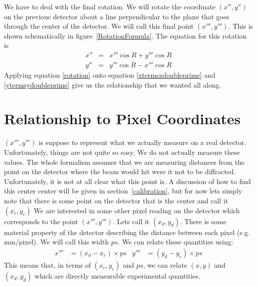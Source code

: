\begin{SCfigure}[1][htb]
    \centering
    
    \caption{Here, we take a point on a plane rotated
    by angle $\beta$ about $\hat y$ and by angle
    $\alpha$ about $\hat x'$. We then rotated this point
    about a line normal to the plane going through the
    origin by angle $R$. Rotating the point is 
    equivalent to rotating the plane.}
    \label{RotationFormula}
\end{SCfigure}

We have to deal with the final rotation. We will
rotate the coordinate $(x'',y'')$ on the
previous detector about a line perpendicular to
the plane that goes through the center of the
detector. We will call this final
point $(x''',y''')$. This is shown schematically 
in figure~\ref{RotationFormula}. The equation for 
this rotation is
\begin{eqnarray}\label{rotation}
    x''&=&x'''\cos R + y'''\cos R\\
    y''&=&y'''\cos R - x'''\cos R
\end{eqnarray}
Applying equation \ref{rotation} onto equation 
\ref{xtermsxdoubleprime} and \ref{ytermsydoubleprime}
give us the relationship that we wanted all along.

\section{Relationship to Pixel Coordinates}

$(x''',y''')$ is suppose to represent what we actually
measure on a real detector. Unfortunately, things are
not quite so easy. We do not actually measure these
values. The whole formalism assumes that we are 
measuring distances from the point on the
detector where the beam would hit were it not to be
diffracted. Unfortunately, it is not at all clear
what this point is. A discussion of how to find
this center center will
be given in section~\ref{calibration}, but for now
lets simply note that there is some point on the detector
that is the center and call it $(x_c,y_c)$ 
We are interested in some other pixel reading
on the detector which corresponds to the point
$(x''',y''')$. Lets call it $(x_d,y_d)$. 
There is some material property of the detector 
describing the distance between each pixel
(e.g. \unit[1000]{mm/pixel}). We will call
this width $ps$. We can relate these quantities 
using:
\begin{align}\label{conversionToPixels}
    x'''&=(x_d-x_c) \times ps &
    y'''&=(y_d-y_c) \times ps
\end{align}
This means that, in terms of $(x_c,y_c)$ and $ps$,
we can relate $(x,y)$ and $(x_d,y_d)$ which are
directly measurable experimental quantities.

